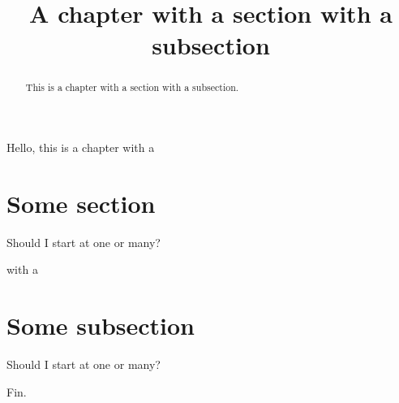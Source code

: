 \documentclass{ximera}
\title{A chapter with a section with a subsection}
\providecommand{\xmsection}{\section}
\begin{document}
\begin{abstract}
  This is a chapter with a section with a subsection.
\end{abstract}
\maketitle




Hello, this is a chapter with a

\xmsection{Some section}


\begin{theorem}
  Should I start at one or many?
\end{theorem}
with a

\xmsection{Some subsection}

\begin{theorem}
  Should I start at one or many?
\end{theorem}



Fin.
\end{document}
